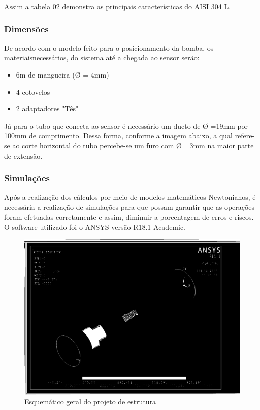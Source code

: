 Assim a tabela 02 demonstra as principais características do AISI 304 L.


\subsubsection{Dimensões}
De acordo com o modelo feito para o posicionamento da bomba, os materiaisnecessários, do sistema até a chegada ao sensor serão:
\begin{itemize}
\item 6m de mangueira (Ø = 4mm)
\item 4 cotovelos
\item 2 adaptadores "Tês"
\end{itemize}

Já para o tubo que conecta ao sensor é necessário um ducto de Ø =19mm por 100mm de comprimento. Dessa forma, conforme a imagem abaixo, a qual refere-se ao corte horizontal do tubo percebe-se um furo com Ø =3mm na maior parte de extensão.


\subsubsection{Simulações}
Após a realização dos cálculos por meio de modelos matemáticos Newtonianos, é necessária a realização de simulações para que possam garantir que as operações foram efetuadas corretamente e assim, diminuir a porcentagem de erros e riscos. O software utilizado foi o ANSYS versão R18.1 Academic.

\begin{figure}[!htb]                                                               
   \centering                                                                      
   \includegraphics[width=15cm, keepaspectratio=true]{figuras/Resultado1.eps}
   \caption{Esquemático geral do projeto de estrutura}                        
\end{figure}

